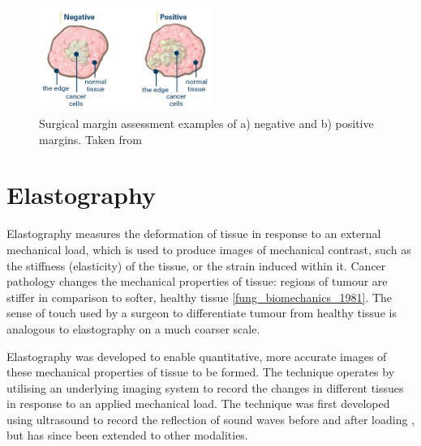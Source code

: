 \begin{figure}[t]
	\centering
    \includegraphics[width=0.5\textwidth]{bground_figs/margins.png}
    \caption{Surgical margin assessment examples of a) negative and b) positive margins. Taken from \cite{breastcancer.org_surgical_2017}}
	    \label{margins}
\end{figure}

\section{Elastography}\label{elastography}
Elastography measures the deformation of tissue in response to an external mechanical load, which is used to produce images of mechanical contrast, such as the stiffness (elasticity) of the tissue, or the strain induced within it. Cancer pathology changes the mechanical properties of tissue: regions of tumour are stiffer in comparison to softer, healthy tissue \ref{fung_biomechanics_1981}. The sense of touch used by a surgeon to differentiate tumour from healthy tissue is analogous to elastography on a much coarser scale. 

Elastography was developed to enable quantitative, more accurate images of these mechanical properties of tissue to be formed. The technique operates by utilising an underlying imaging system to record the changes in different tissues in response to an applied mechanical load. The technique was first developed using ultrasound to record the reflection of sound waves before and after loading \cite{ophir_elastography:_1991}, but has since been extended to other modalities. 

